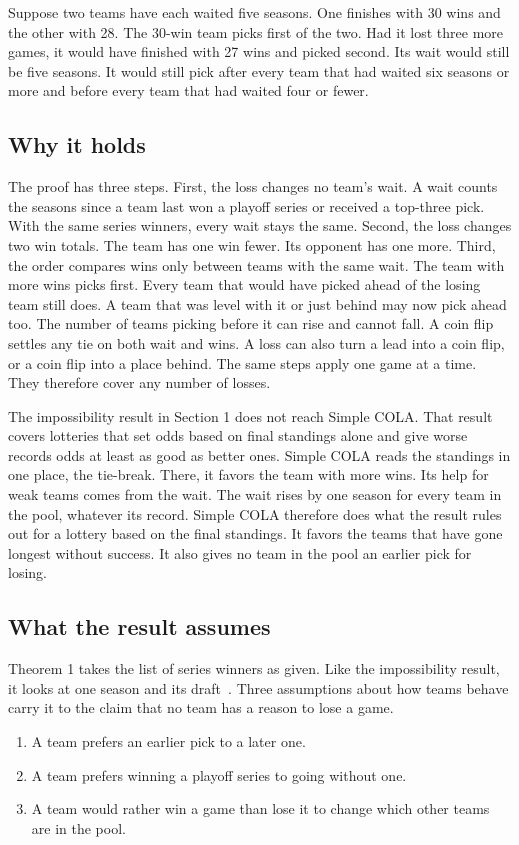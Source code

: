\documentclass[11pt,letterpaper]{article}
\begin{document}
Suppose two teams have each waited five seasons. One finishes with 30 wins and the other with 28. The 30-win team picks first of the two. Had it lost three more games, it would have finished with 27 wins and picked second. Its wait would still be five seasons. It would still pick after every team that had waited six seasons or more and before every team that had waited four or fewer.

\subsection{Why it holds}

The proof has three steps. First, the loss changes no team's wait. A wait counts the seasons since a team last won a playoff series or received a top-three pick. With the same series winners, every wait stays the same. Second, the loss changes two win totals. The team has one win fewer. Its opponent has one more. Third, the order compares wins only between teams with the same wait. The team with more wins picks first. Every team that would have picked ahead of the losing team still does. A team that was level with it or just behind may now pick ahead too. The number of teams picking before it can rise and cannot fall. A coin flip settles any tie on both wait and wins. A loss can also turn a lead into a coin flip, or a coin flip into a place behind. The same steps apply one game at a time. They therefore cover any number of losses.

The impossibility result in Section 1 does not reach Simple COLA. That result covers lotteries that set odds based on final standings alone and give worse records odds at least as good as better ones. Simple COLA reads the standings in one place, the tie-break. There, it favors the team with more wins. Its help for weak teams comes from the wait. The wait rises by one season for every team in the pool, whatever its record. Simple COLA therefore does what the result rules out for a lottery based on the final standings. It favors the teams that have gone longest without success. It also gives no team in the pool an earlier pick for losing.

\subsection{What the result assumes}

Theorem 1 takes the list of series winners as given. Like the impossibility result, it looks at one season and its draft~\cite{munro2020notanking}. Three assumptions about how teams behave carry it to the claim that no team has a reason to lose a game.
\begin{enumerate}
\item A team prefers an earlier pick to a later one.
\item A team prefers winning a playoff series to going without one.
\item A team would rather win a game than lose it to change which other teams are in the pool.
\end{enumerate}
\end{document}
